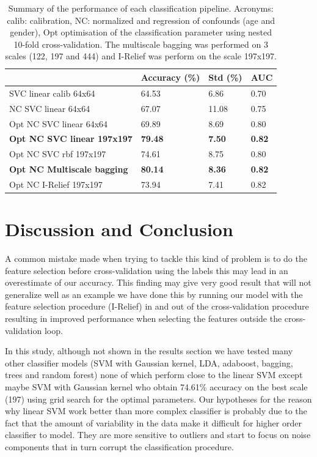 \documentclass[12pt,journal,compsoc]{IEEEtran}
\begin{document}
\begin{table}[h]
\begin{tabular}{llll}
\hline
                                   & Accuracy (\%)  & Std (\%)      & AUC           \\ \hline
SVC linear calib 64x64             & 64.53          & 6.86          & 0.70          \\
NC SVC linear 64x64                & 67.07          & 11.08         & 0.75          \\
Opt NC SVC linear 64x64            & 69.89          & 8.69          & 0.80          \\
\textbf{Opt NC SVC linear 197x197} & \textbf{79.48} & \textbf{7.50} & \textbf{0.82} \\
Opt NC SVC rbf 197x197             & 74.61          & 8.75          & 0.80          \\
\textbf{Opt NC Multiscale bagging} & \textbf{80.14} & \textbf{8.36} & \textbf{0.82} \\
Opt NC I-Relief 197x197            & 73.94          & 7.41          & 0.82          \\ \hline
\end{tabular}
\label{tab_results}
\caption{Summary of the performance of each classification pipeline. Acronyms: calib: calibration, NC: normalized and regression of confounds (age and gender), Opt optimisation of the classification parameter using nested 10-fold cross-validation. The multiscale bagging was performed on 3 scales (122, 197 and 444) and I-Relief was perform on the scale 197x197. }
\end{table}

\section{Discussion and Conclusion}

A common mistake made when trying to tackle this kind of problem is to do the feature selection before cross-validation using the labels this may lead in an overestimate of our accuracy. This finding may give very good result that will not generalize well as an example we have done this by running our model with the feature selection procedure (I-Relief) in and out of the cross-validation procedure resulting in improved performance when selecting the features outside the cross-validation loop.

In this study, although not shown in the results section we have tested many other classifier models (SVM with Gaussian kernel, LDA, adaboost, bagging, trees and random forest) none of which perform close to the linear SVM except maybe SVM with Gaussian kernel who obtain 74.61\% accuracy on the best scale (197) using grid search for the optimal parameters. Our hypotheses for the reason why linear SVM work better than more complex classifier is probably due to the fact that the amount of variability in the data make it difficult for higher order classifier to model.  They are more sensitive to outliers and start to focus on noise components that in turn corrupt the classification procedure.
\end{document}
